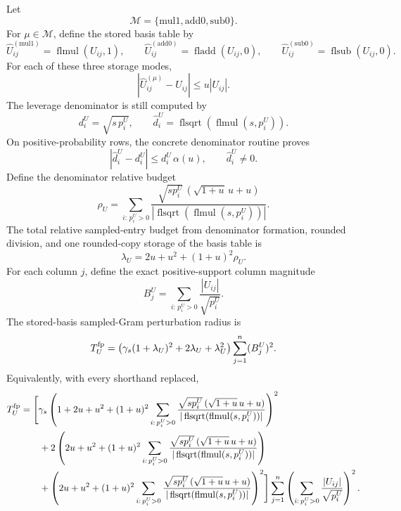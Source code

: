 \documentclass[11pt]{article}
\theoremstyle{remark}
\begin{document}
Let
\[
  \mathcal M=\{\mathrm{mul1},\mathrm{add0},\mathrm{sub0}\}.
\]
For \(\mu\in\mathcal M\), define the stored basis table by
\[
  \widehat U^{(\mathrm{mul1})}_{ij}
    =\operatorname{flmul}(U_{ij},1),
  \qquad
  \widehat U^{(\mathrm{add0})}_{ij}
    =\operatorname{fladd}(U_{ij},0),
  \qquad
  \widehat U^{(\mathrm{sub0})}_{ij}
    =\operatorname{flsub}(U_{ij},0).
\]
For each of these three storage modes,
\[
  |\widehat U^{(\mu)}_{ij}-U_{ij}|\le u|U_{ij}|.
\]
The leverage denominator is still computed by
\[
  d_i^U=\sqrt{s\,p_i^U},
  \qquad
  \widehat d_i^U
  =
  \operatorname{flsqrt}(\operatorname{flmul}(s,p_i^U)).
\]
On positive-probability rows, the concrete denominator routine proves
\[
  |\widehat d_i^U-d_i^U|\le d_i^U\,\alpha(u),
  \qquad
  \widehat d_i^U\ne0.
\]
Define the denominator relative budget
\[
  \rho_U
  =
  \sum_{i:\,p_i^U>0}
  \frac{\sqrt{s p_i^U}\,(\sqrt{1+u}\,u+u)}
       {|\operatorname{flsqrt}(\operatorname{flmul}(s,p_i^U))|}.
\]
The total relative sampled-entry budget from denominator formation, rounded
division, and one rounded-copy storage of the basis table is
\[
  \lambda_U
  =
  2u+u^2+(1+u)^2\rho_U .
\]
For each column \(j\), define the exact positive-support column magnitude
\[
  B_j^U
  =
  \sum_{i:\,p_i^U>0}\frac{|U_{ij}|}{\sqrt{p_i^U}}.
\]
The stored-basis sampled-Gram perturbation radius is
\[
  T_U^{\rm fp}
  =
  \left(
    \gamma_s(1+\lambda_U)^2+2\lambda_U+\lambda_U^2
  \right)
  \sum_{j=1}^n (B_j^U)^2 .
\]
Equivalently, with every shorthand replaced,
\[
\begin{aligned}
T_U^{\rm fp}
&=
\Biggl[
\gamma_s
\left(
  1+
  2u+u^2
  +(1+u)^2
  \sum_{i:\,p_i^U>0}
  \frac{\sqrt{s p_i^U}\,(\sqrt{1+u}\,u+u)}
       {|\operatorname{flsqrt}(\operatorname{flmul}(s,p_i^U))|}
\right)^2 \\
&\qquad
+2\left(
  2u+u^2
  +(1+u)^2
  \sum_{i:\,p_i^U>0}
  \frac{\sqrt{s p_i^U}\,(\sqrt{1+u}\,u+u)}
       {|\operatorname{flsqrt}(\operatorname{flmul}(s,p_i^U))|}
\right) \\
&\qquad
+\left(
  2u+u^2
  +(1+u)^2
  \sum_{i:\,p_i^U>0}
  \frac{\sqrt{s p_i^U}\,(\sqrt{1+u}\,u+u)}
       {|\operatorname{flsqrt}(\operatorname{flmul}(s,p_i^U))|}
\right)^2
\Biggr]
\sum_{j=1}^n
\left(
  \sum_{i:\,p_i^U>0}\frac{|U_{ij}|}{\sqrt{p_i^U}}
\right)^2 .
\end{aligned}
\]
\end{document}
